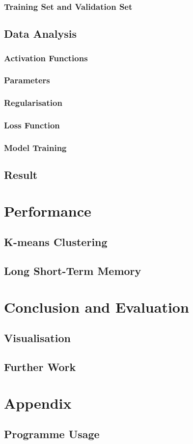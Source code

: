 \documentclass[11pt]{article} %
\theoremstyle{plain}
\theoremstyle{definition}
\begin{document}
\subsubsection{Training Set and Validation Set}
\subsection{Data Analysis}
\subsubsection{Activation Functions}
\subsubsection{Parameters}
\subsubsection{Regularisation}
\subsubsection{Loss Function}
\subsubsection{Model Training}
\subsection{Result}

\section{Performance}
\subsection{K-means Clustering}
\subsection{Long Short-Term Memory}

\section{Conclusion and Evaluation}
\subsection{Visualisation}
\subsection{Further Work}

\section{Appendix}
\subsection{Programme Usage}



\end{document}
